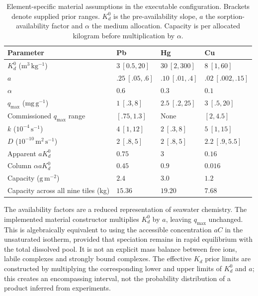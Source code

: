 \begin{table}[htbp]
\centering\small
\caption{Element-specific material assumptions in the executable configuration. Brackets denote supplied prior ranges. $K_d^0$ is the pre-availability slope, $a$ the sorption-availability factor and $\alpha$ the medium allocation. Capacity is per allocated kilogram before multiplication by $\alpha$.}\label{tab:material_defaults}
\begin{tabular}{@{}p{}lll@{}}
\toprule Parameter & Pb & Hg & Cu \\
\midrule
$K_d^0$ ($\mathrm{m^3\,kg^{-1}}$) & $3\ [0.5,20]$ & $30\ [2,300]$ & $8\ [1,60]$ \\
$a$ & $.25\ [.05,.6]$ & $.10\ [.01,.4]$ & $.02\ [.002,.15]$ \\
$\alpha$ & $0.6$ & $0.3$ & $0.1$ \\
$q_{\max}$ ($\mathrm{mg\,g^{-1}}$) & $1\ [.3,8]$ & $2.5\ [.2,25]$ & $3\ [.5,20]$ \\
Commissioned $q_{\max}$ range & $[.75,1.3]$ & None & $[2,4.5]$ \\
$k$ ($10^{-4}\,\mathrm{s^{-1}}$) & $4\ [1,12]$ & $2\ [.3,8]$ & $5\ [1,15]$ \\
$D$ ($10^{-10}\,\mathrm{m^2\,s^{-1}}$) & $2\ [.8,5]$ & $2\ [.8,5]$ & $2.2\ [.9,5.5]$ \\
\midrule
Apparent $aK_d^0$ & $0.75$ & $3$ & $0.16$ \\
Column $\alpha aK_d^0$ & $0.45$ & $0.9$ & $0.016$ \\
Capacity ($\mathrm{g\,m^{-2}}$) & $2.4$ & $3.0$ & $1.2$ \\
Capacity across all nine tiles (kg) & $15.36$ & $19.20$ & $7.68$ \\
\bottomrule
\end{tabular}
\end{table}

The availability factors are a reduced representation of seawater chemistry. The implemented material constructor multiplies $K_d^0$ by $a$, leaving $q_{\max}$ unchanged. This is algebraically equivalent to using the accessible concentration $aC$ in the unsaturated isotherm, provided that speciation remains in rapid equilibrium with the total dissolved pool. It is not an explicit mass balance between free ions, labile complexes and strongly bound complexes. The effective $K_d$ prior limits are constructed by multiplying the corresponding lower and upper limits of $K_d^0$ and $a$; this creates an encompassing interval, not the probability distribution of a product inferred from experiments.

